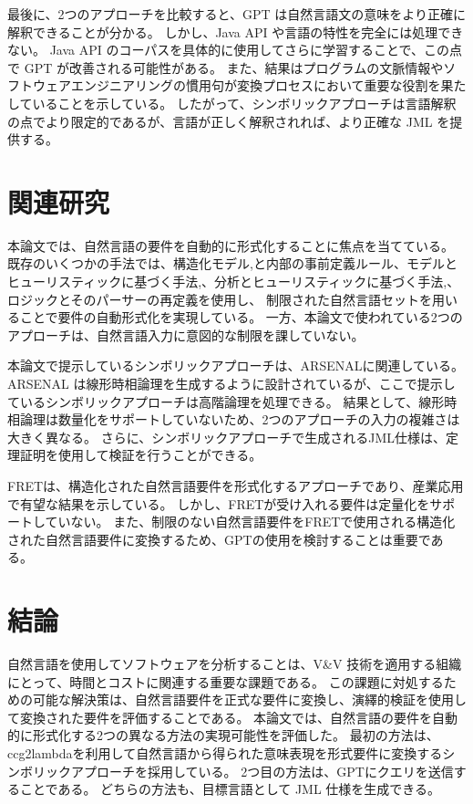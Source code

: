 \documentclass[uplatex, twocolumn,10pt]{jsarticle} %
\begin{document}
最後に、2つのアプローチを比較すると、GPT は自然言語文の意味をより正確に解釈できることが分かる。
しかし、Java API や言語の特性を完全には処理できない。
Java API のコーパスを具体的に使用してさらに学習することで、この点で GPT が改善される可能性がある。
また、結果はプログラムの文脈情報やソフトウェアエンジニアリングの慣用句が変換プロセスにおいて重要な役割を果たしていることを示している。
したがって、シンボリックアプローチは言語解釈の点でより限定的であるが、言語が正しく解釈されれば、より正確な JML を提供する。

\section{関連研究}
\label{sec:related_work}
本論文では、自然言語の要件を自動的に形式化することに焦点を当てている。
既存のいくつかの手法では、構造化モデル\cite{8},\cite{9}と内部の事前定義ルール\cite{10}、モデルとヒューリスティックに基づく手法\cite{11},\cite{12}、分析とヒューリスティックに基づく手法\cite{13},\cite{14}、ロジックとそのパーサーの再定義\cite{15}を使用し、
制限された自然言語セットを用いることで要件の自動形式化を実現している。
一方、本論文で使われている2つのアプローチは、自然言語入力に意図的な制限を課していない。

本論文で提示しているシンボリックアプローチは、ARSENAL\cite{16}に関連している。
ARSENAL は線形時相論理を生成するように設計されているが、ここで提示しているシンボリックアプローチは高階論理を処理できる。
結果として、線形時相論理は数量化をサポートしていないため、2つのアプローチの入力の複雑さは大きく異なる。
さらに、シンボリックアプローチで生成されるJML仕様は、定理証明を使用して検証を行うことができる。

FRET\cite{17}は、構造化された自然言語要件を形式化するアプローチであり、産業応用で有望な結果を示している。
しかし、FRETが受け入れる要件は定量化をサポートしていない。
また、制限のない自然言語要件をFRETで使用される構造化された自然言語要件に変換するため、GPTの使用を検討することは重要である。

\section{結論}
\label{sec:conclusion}
自然言語を使用してソフトウェアを分析することは、V\&V 技術を適用する組織にとって、時間とコストに関連する重要な課題である。
この課題に対処するための可能な解決策は、自然言語要件を正式な要件に変換し、演繹的検証を使用して変換された要件を評価することである。
本論文では、自然言語の要件を自動的に形式化する2つの異なる方法の実現可能性を評価した。
最初の方法は、ccg2lambda\cite{3}を利用して自然言語から得られた意味表現を形式要件に変換するシンボリックアプローチを採用している。
2つ目の方法は、GPT\cite{2}にクエリを送信することである。
どちらの方法も、目標言語として JML 仕様を生成できる。
\end{document}
